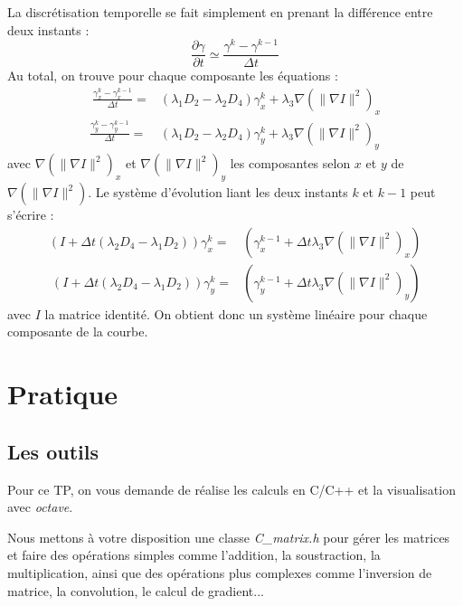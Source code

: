 \documentclass[10pt,a4paper]{article}
\begin{document}
La discr\'{e}tisation temporelle se fait simplement en prenant la diff\'{e}rence entre deux instants : 
\begin{displaymath}
	\frac{\partial \gamma}{\partial t} \simeq \frac{\gamma^{k}-\gamma^{k-1}}{\Delta t}
\end{displaymath}
Au total, on trouve pour chaque composante les \'{e}quations : 
\begin{eqnarray}~\label{discreteSnake}
	\frac{\gamma_{x}^{k}-\gamma_{x}^{k-1}}{\Delta t}=& (\lambda_1 D_2 -\lambda_2 D_4)\gamma_{x}^{k} + \lambda_3 \nabla(\|\nabla I\|^2)_{x}\\
	\frac{\gamma_{y}^{k}-\gamma_{y}^{k-1}}{\Delta t}=& (\lambda_1 D_2 -\lambda_2 D_4)\gamma_{y}^{k} + \lambda_3 \nabla(\|\nabla I\|^2)_{y}
\end{eqnarray}
avec $\nabla(\|\nabla I\|^2)_{x}$ et $\nabla(\|\nabla I\|^2)_{y}$ les composantes selon $x$ et $y$ de $\nabla(\|\nabla I\|^2)$. Le syst\`{e}me d'\'{e}volution liant les deux instants $k$ et $k-1$ peut s'\'{e}crire : 
\begin{eqnarray}\label{evolutionSnakex}
	(I+\Delta t (\lambda_2 D_4 - \lambda_1 D_2)) \gamma_{x}^{k} =&  (\gamma_{x}^{k-1} + \Delta t  \lambda_3 \nabla(\|\nabla I\|^2)_{x} )\\
~\label{evolutionSnakey}
	(I+\Delta t (\lambda_2 D_4 - \lambda_1 D_2)) \gamma_{y}^{k} =&  (\gamma_{y}^{k-1} + \Delta t  \lambda_3 \nabla(\|\nabla I\|^2)_{y} )
\end{eqnarray}
avec $I$ la matrice identit\'{e}. On obtient donc un syst\`{e}me lin\'{e}aire pour chaque composante de la courbe.



\clearpage
\section{Pratique}
\subsection{Les outils}
Pour ce TP, on vous demande de r\'{e}alise les calculs en C/C++ et la visualisation avec \textit{octave}.

Nous mettons \`{a} votre disposition une classe \textit{C\_matrix.h} pour g\'{e}rer les matrices et faire des op\'{e}rations simples comme l'addition, la soustraction, la multiplication, ainsi que des op\'{e}rations plus complexes comme l'inversion de matrice, la convolution, le calcul de gradient...
\end{document}
